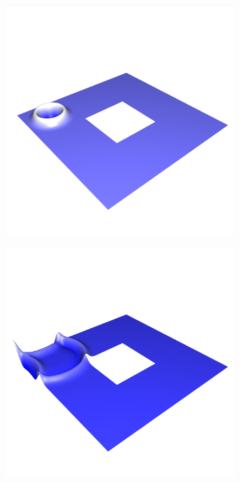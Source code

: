 \documentclass[crop=false,10pt,ngerman]{standalone}
\begin{document}
\begin{figure}[p]
\begin{subfigure}[b]{0.24\textwidth}
          \includegraphics[trim={0.9cm 1.8cm 0.5cm 5cm},clip,width=0.95\textwidth]{images/ring_wave_1.png}
          \caption{}
        \end{subfigure}
        \begin{subfigure}[b]{0.24\textwidth}
          \center
          \includegraphics[trim={0.9cm 1.8cm 0.5cm 5cm},clip,width=0.95\textwidth]{images/ring_wave_2.png}

\end{subfigure}
\end{figure}
\end{document}
